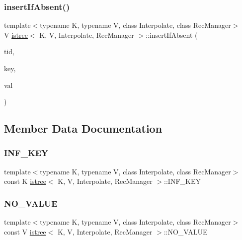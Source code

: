 \mbox{\label{classistree_a5831a1cedefe4d8bd4c3ef136724a1d8}} 
\subsubsection{\texorpdfstring{insert\+If\+Absent()}{insertIfAbsent()}}
{\footnotesize\ttfamily template$<$typename K, typename V, class Interpolate, class Rec\+Manager$>$ \\
V \hyperlink{classistree}{istree}$<$ K, V, Interpolate, Rec\+Manager $>$\+::insert\+If\+Absent (\begin{DoxyParamCaption}\item[{const int}]{tid,  }\item[{const K \&}]{key,  }\item[{const V \&}]{val }\end{DoxyParamCaption})\hspace{0.3cm}{\ttfamily [inline]}}



\subsection{Member Data Documentation}
\mbox{\label{classistree_a82526895c0658e507b6877d52143040f}} 
\subsubsection{\texorpdfstring{I\+N\+F\+\_\+\+K\+EY}{INF\_KEY}}
{\footnotesize\ttfamily template$<$typename K, typename V, class Interpolate, class Rec\+Manager$>$ \\
const K \hyperlink{classistree}{istree}$<$ K, V, Interpolate, Rec\+Manager $>$\+::I\+N\+F\+\_\+\+K\+EY}

\mbox{\label{classistree_aabacf063ee71242dfc03db8aea51c0c7}} 
\subsubsection{\texorpdfstring{N\+O\+\_\+\+V\+A\+L\+UE}{NO\_VALUE}}
{\footnotesize\ttfamily template$<$typename K, typename V, class Interpolate, class Rec\+Manager$>$ \\
const V \hyperlink{classistree}{istree}$<$ K, V, Interpolate, Rec\+Manager $>$\+::N\+O\+\_\+\+V\+A\+L\+UE}

